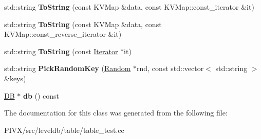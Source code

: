 \begin{DoxyCompactItemize}
std\+::string {\bfseries To\+String} (const K\+V\+Map \&data, const K\+V\+Map\+::const\+\_\+iterator \&it)
\item 
\mbox{\label{classleveldb_1_1_harness_a7589308a4592b9edb4142825b743244c}} 
std\+::string {\bfseries To\+String} (const K\+V\+Map \&data, const K\+V\+Map\+::const\+\_\+reverse\+\_\+iterator \&it)
\item 
\mbox{\label{classleveldb_1_1_harness_a1cdf351918a2e969bce1c29290317403}} 
std\+::string {\bfseries To\+String} (const \mbox{\hyperlink{classleveldb_1_1_iterator}{Iterator}} $\ast$it)
\item 
\mbox{\label{classleveldb_1_1_harness_ab6f2d80f97eb56fc65d4a9177cd86c03}} 
std\+::string {\bfseries Pick\+Random\+Key} (\mbox{\hyperlink{classleveldb_1_1_random}{Random}} $\ast$rnd, const std\+::vector$<$ std\+::string $>$ \&keys)
\item 
\mbox{\label{classleveldb_1_1_harness_ab370dc0e64bbb01d47af4e624441fde4}} 
\mbox{\hyperlink{classleveldb_1_1_d_b}{DB}} $\ast$ {\bfseries db} () const
\end{DoxyCompactItemize}


The documentation for this class was generated from the following file\+:\begin{DoxyCompactItemize}
\item 
P\+I\+V\+X/src/leveldb/table/table\+\_\+test.\+cc\end{DoxyCompactItemize}
